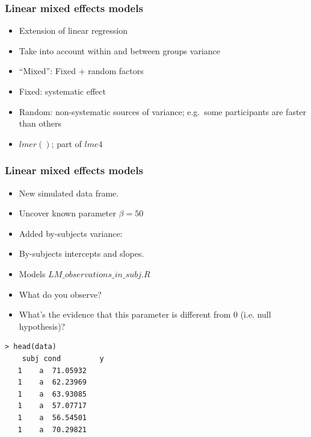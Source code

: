 \begin{frame}
	\frametitle{Linear mixed effects models}
	
	\begin{itemize}
		\item Extension of linear regression
		\item Take into account within and between groups variance
		\item ``Mixed'': Fixed + random factors
		\item Fixed: systematic effect
		\item Random: non-systematic sources of variance; e.g.~some participants are faster than others
		\item $lmer()$; part of $lme4$ \cite{bates2015}
	\end{itemize}

\end{frame}


\begin{frame}[fragile]
	\frametitle{Linear mixed effects models}

\begin{minipage}{.6\textwidth}
	\begin{itemize}
		\item New simulated data frame.
		\item Uncover known parameter $\beta = 50$
		\item Added by-subjects variance:
		\item[] By-subjects intercepts and slopes.
		\item Models $LM\_observations\_in\_subj.R$	
		\item What do you observe?			
		\item What's the evidence that this parameter is different from 0 (i.e. null hypothesis)?
	\end{itemize}
\end{minipage}	
\hfill
\begin{minipage}{.35\textwidth}
	\begin{verbatim}
> head(data)
	subj cond         y
   1    a  71.05932
   1    a  62.23969
   1    a  63.93085
   1    a  57.07717
   1    a  56.54501
   1    a  70.29821
	\end{verbatim}
\end{minipage}	
	
\end{frame}



